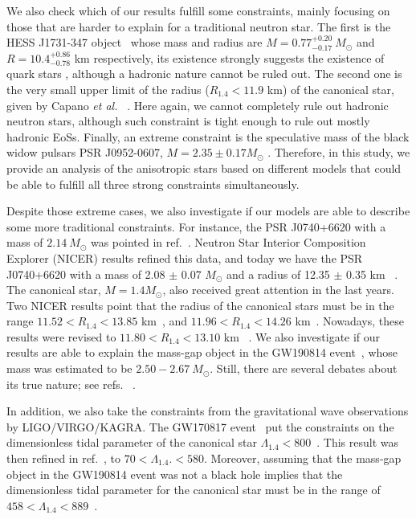 \documentclass[%
reprint,
superscriptaddress,
nofootinbib,
amsmath,
amssymb,
aps,
floatfix,
showkeys,
]{revtex4-2}
\begin{document}
We also check which of our results fulfill some constraints,  mainly focusing on those that are harder to explain for a traditional neutron star. The first is the HESS J1731-347 object~\cite{Doroshenko_2022} whose mass and radius are $M=0.77_{-0.17}^{+0.20}~M_\odot$ and $R = 10.4 _{-0.78}^{+0.86}$ km respectively, its existence strongly suggests the existence of quark stars \cite{Lopes2023M}, although a hadronic nature cannot be ruled out. The second one is the very small upper limit of the radius ($R_{1.4}<11.9$ km) of the canonical star,  given by Capano {\it et al.} ~\cite{Capano_2020}. Here again, we cannot completely rule out hadronic neutron stars, although such constraint is tight enough to rule out mostly hadronic EoSs. Finally, an extreme constraint is the {speculative}  mass of the black widow pulsars PSR J0952-0607, $M = 2.35\pm0.17 M_\odot$ \cite{Romani_2022}. Therefore, in this study, we provide an analysis of the anisotropic stars based on different models that could be able to fulfill all three strong constraints simultaneously.

Despite those extreme cases, we also investigate if our models are able to describe some more traditional constraints. For instance, the PSR J0740+6620 with a mass of $2.14 \ M_\odot$ was pointed in ref.~\cite{Cromartie_2020}. Neutron Star Interior Composition Explorer (NICER) results refined this data, and today we have the PSR J0740+6620 with a mass of 2.08 $\pm$ 0.07 $M_\odot$ and a radius of 12.35 $\pm$ 0.35 km ~\cite{Miller_2021}. The canonical star, $M =1.4 M_\odot$, also received great attention in the last years. Two NICER results point that the radius of the canonical stars must be in the range $11.52 <R_{1.4}< 13.85$ km~\cite{Riley_2019}, and $11.96 <R_{1.4}< 14.26$ km~\cite{Miller_2019}. Nowadays, these results were revised to $11.80 <R_{1.4}< 13.10$ km ~\cite{Miller_2021}. We also investigate if our results are able to explain the mass-gap object in the GW190814 event~\cite{RAbbott_2020}, whose mass was estimated to be $2.50 - 2.67 \ M_\odot$. Still, there are several debates about its true nature; see refs. 
~\cite{Lopes_ApJ, Das_PRD_2021}.

In addition, we also take the constraints from the gravitational wave observations by LIGO/VIRGO/KAGRA. The GW170817 event~\cite{Abbott_2017} put the constraints on the dimensionless tidal parameter of the canonical star  $\Lambda_{1.4}<800$~\cite{Abbott_2017}. This result was then refined in ref.~\cite{Abbott_2018}, to  $70<\Lambda_{1.4}.<580$. Moreover, assuming that the mass-gap object in the GW190814 event was not a black hole implies that the dimensionless tidal parameter for the canonical star must be in the range of $458 <\Lambda_{1.4}<889$~\cite{RAbbott_2020}. 
\end{document}
